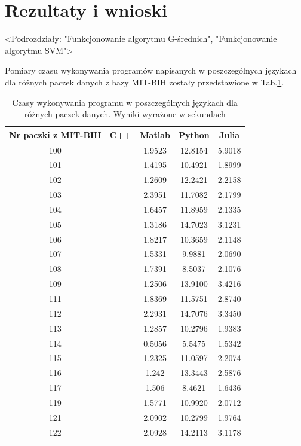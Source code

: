 \section{Rezultaty i wnioski}

<Podrozdziały: "Funkcjonowanie algorytmu G-średnich", "Funkcjonowanie algorytmu SVM">

Pomiary czasu wykonywania programów napisanych w poszczególnych językach dla różnych paczek danych z bazy MIT-BIH zostały przedstawione w Tab.\ref{tabResults}.

\begin{table}[!tp]
	\centering
	\caption{Czasy wykonywania programu w poszczególnych językach dla różnych paczek danych. Wyniki wyrażone w sekundach}
	\label{tabResults}
	\begin{tabular}{|c|c|c|c|c|}
		\hline
		Nr paczki z MIT-BIH & C++ & Matlab & Python & Julia\\ \hline		
		100 & & 1.9523 & 12.8154 & 5.9018\\ \hline
		101 & & 1.4195 & 10.4921 & 1.8999\\ \hline
		102 & & 1.2609 & 12.2421 & 2.2158\\ \hline
		103 & & 2.3951 & 11.7082 & 2.1799\\ \hline
		104 & & 1.6457 & 11.8959 & 2.1335\\ \hline
		105 & & 1.3186 & 14.7023 & 3.1231\\ \hline
		106 & & 1.8217 & 10.3659 & 2.1148\\ \hline
		107 & & 1.5331 &  9.9881 & 2.0690\\ \hline
		108 & & 1.7391 &  8.5037 & 2.1076\\ \hline
		109 & & 1.2506 & 13.9100 & 3.4216\\ \hline
		111 & & 1.8369 & 11.5751 & 2.8740\\ \hline
		112 & & 2.2931 & 14.7076 & 3.3450\\ \hline
		113 & & 1.2857 & 10.2796 & 1.9383\\ \hline
		114 & & 0.5056 &  5.5475 & 1.5342\\ \hline
		115 & & 1.2325 & 11.0597 & 2.2074\\ \hline
		116 & & 1.242  & 13.3443 & 2.5876\\ \hline
		117 & & 1.506  &  8.4621 & 1.6436\\ \hline
		119 & & 1.5771 & 10.9920 & 2.0712\\ \hline
		121 & & 2.0902 & 10.2799 & 1.9764\\ \hline
		122 & & 2.0928 & 14.2113 & 3.1178\\ \hline

\end{tabular}
\end{table}
